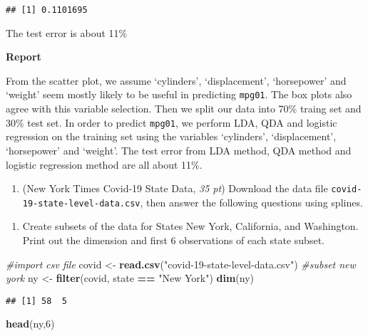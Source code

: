 \documentclass[]{article}
\newenvironment{Shaded}{\begin{snugshade}}{\end{snugshade}}
\newcommand{\CommentTok}[1]{\textcolor[rgb]{0.56,0.35,0.01}{\textit{#1}}}
\newcommand{\DecValTok}[1]{\textcolor[rgb]{0.00,0.00,0.81}{#1}}
\newcommand{\KeywordTok}[1]{\textcolor[rgb]{0.13,0.29,0.53}{\textbf{#1}}}
\newcommand{\NormalTok}[1]{#1}
\newcommand{\OperatorTok}[1]{\textcolor[rgb]{0.81,0.36,0.00}{\textbf{#1}}}
\newcommand{\StringTok}[1]{\textcolor[rgb]{0.31,0.60,0.02}{#1}}
\providecommand{\tightlist}{%
  \setlength{\itemsep}{0pt}\setlength{\parskip}{0pt}}
\begin{document}
\begin{verbatim}
## [1] 0.1101695
\end{verbatim}

The test error is about 11\%

\textbf{Report}

From the scatter plot, we assume `cylinders', `displacement',
`horsepower' and `weight' seem mostly likely to be useful in predicting
\texttt{mpg01}. The box plots also agree with this variable selection.
Then we split our data into 70\% traing set and 30\% test set. In order
to predict \texttt{mpg01}, we perform LDA, QDA and logistic regression
on the training set using the variables `cylinders', `displacement',
`horsepower' and `weight'. The test error from LDA method, QDA method
and logistic regression method are all about 11\%.

\begin{enumerate}
\def\labelenumi{\arabic{enumi}.}
\setcounter{enumi}{1}
\tightlist
\item
  (New York Times Covid-19 State Data, \emph{35 pt}) Download the data
  file \texttt{covid-19-state-level-data.csv}, then answer the following
  questions using splines.
\end{enumerate}

\begin{enumerate}
\def\labelenumi{(\alph{enumi})}
\tightlist
\item
  Create subsets of the data for States New York, California, and
  Washington. Print out the dimension and first 6 observations of each
  state subset.
\end{enumerate}

\begin{Shaded}
\begin{Highlighting}[]
\CommentTok{#import csv file}
\NormalTok{covid <-}\StringTok{ }\KeywordTok{read.csv}\NormalTok{(}\StringTok{"covid-19-state-level-data.csv"}\NormalTok{)}
\CommentTok{#subset new york}
\NormalTok{ny <-}\StringTok{ }\KeywordTok{filter}\NormalTok{(covid, state }\OperatorTok{==}\StringTok{ "New York"}\NormalTok{)}
\KeywordTok{dim}\NormalTok{(ny)}
\end{Highlighting}
\end{Shaded}

\begin{verbatim}
## [1] 58  5
\end{verbatim}

\begin{Shaded}
\begin{Highlighting}[]
\KeywordTok{head}\NormalTok{(ny,}\DecValTok{6}\NormalTok{)}
\end{Highlighting}
\end{Shaded}
\end{document}
